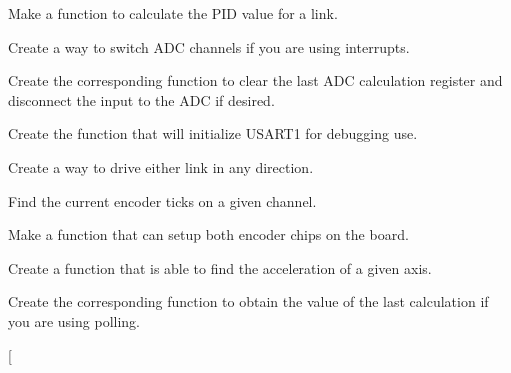
\begin{DoxyRefList}
\item[\label{todo__todo000018}%
\hypertarget{todo__todo000018}{}%
Global \hyperlink{_p_i_d_8h_a0b728f39f71526d44fd7cff0ce67319e}{calc\-P\-I\-D} (char link, int set\-Point, int act\-Pos)]Make a function to calculate the P\-I\-D value for a link.  
\item[\label{todo__todo000004}%
\hypertarget{todo__todo000004}{}%
Global \hyperlink{_a_d_c_8h_a8174ca24b578eaf4f82f44d6ce44edb0}{change\-A\-D\-C} (int channel)]Create a way to switch A\-D\-C channels if you are using interrupts.  
\item[\label{todo__todo000002}%
\hypertarget{todo__todo000002}{}%
Global \hyperlink{_a_d_c_8h_a3eef680fc13f11498db80fb145cab8f9}{clear\-A\-D\-C} (int channel)]Create the corresponding function to clear the last A\-D\-C calculation register and disconnect the input to the A\-D\-C if desired.  
\item[\label{todo__todo000028}%
\hypertarget{todo__todo000028}{}%
Global \hyperlink{_u_s_a_r_t_debug_8h_a9a96eb5e6b5a13fff8ed69716e76a314}{debug\-U\-S\-A\-R\-T\-Init} (unsigned long baudrate)]Create the function that will initialize U\-S\-A\-R\-T1 for debugging use.  
\item[\label{todo__todo000009}%
\hypertarget{todo__todo000009}{}%
Global \hyperlink{motors_8h_af4a8cb121ce437984322ade3672082d2}{drive\-Link} (int link, int dir)]Create a way to drive either link in any direction.  
\item[\label{todo__todo000015}%
\hypertarget{todo__todo000015}{}%
Global \hyperlink{_periph_8h_a6c804bfcd9e9943d093395f535a3b672}{enc\-Count} (int chan)]Find the current encoder ticks on a given channel.  
\item[\label{todo__todo000013}%
\hypertarget{todo__todo000013}{}%
Global \hyperlink{_periph_8h_a15de8c2dd97f966ce278ab793669adfd}{enc\-Init} (int chan)]Make a function that can setup both encoder chips on the board.  
\item[\label{todo__todo000011}%
\hypertarget{todo__todo000011}{}%
Global \hyperlink{_periph_8h_a664961c139fdb66c6fd0fb0e997df433}{get\-Accel} (int axis)]Create a function that is able to find the acceleration of a given axis.  
\item[\label{todo__todo000003}%
\hypertarget{todo__todo000003}{}%
Global \hyperlink{_a_d_c_8h_a9f560657fb624f98de3161651f3d4385}{get\-A\-D\-C} (int channel)]Create the corresponding function to obtain the value of the last calculation if you are using polling.  
\item[\label{todo__todo000030}%

\end{DoxyRefList}

